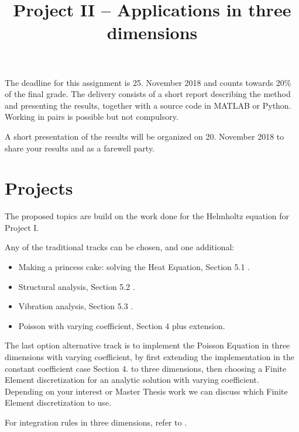 \documentclass[assignment]{tmanotes}
\title{Project II -- Applications in three dimensions}
\date{}
\begin{document}
\maketitle

The deadline for this assignment is 25. November 2018 and counts towards 20\% of the final grade.
The delivery consists of a short report describing the method and presenting the results, together with a source code in MATLAB or Python.
Working in pairs is possible but not compulsory.

\medskip
A short presentation of the results will be organized on 20. November 2018 to share your results and as a farewell party.

\section{Projects}

The proposed topics are build on the work done for the Helmholtz equation for Project I.

\medskip
Any of the traditional tracks can be chosen, and one additional:
\begin{itemize}
\item Making a princess cake: solving the Heat Equation, Section 5.1 \cite{P2}.
\item Structural analysis, Section 5.2 \cite{P2}.
\item Vibration analysis, Section 5.3 \cite{P2}.
\item Poisson with varying coefficient, Section 4 \cite{P1} plus extension.
\end{itemize}

\medskip
The last option alternative track is to implement the Poisson Equation in three dimensions with varying coefficient, by first extending the implementation in the constant coefficient case Section 4. \cite{P1} to three dimensions, then choosing a Finite Element discretization for an analytic solution with varying coefficient.
Depending on your interest or Master Thesis work we can discuss which Finite Element discretization to use.

\medskip
For integration rules in three dimensions, refer to \cite{P1}.


\end{document}
